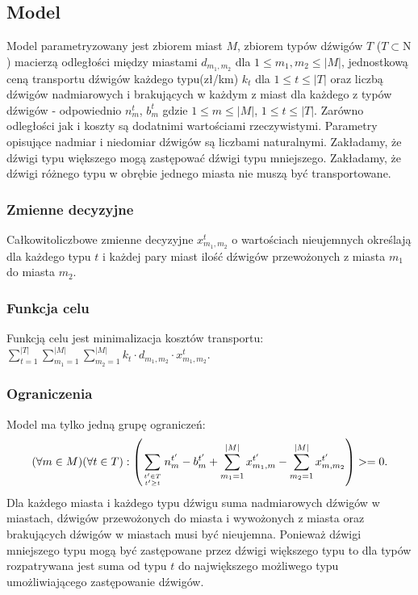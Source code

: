 \documentclass{article}
\begin{document}
\subsection{Model}
Model parametryzowany jest zbiorem miast $M$, zbiorem typów dźwigów $T$ ($T \subset \mathrm{N}$)  macierzą odległości między miastami $d_{m_1, m_2}$ dla $1 \leq m_1, m_2 \leq |M|$, jednostkową ceną transportu dźwigów każdego typu(zł/km) $k_t$ dla $1 \leq t \leq |T|$ oraz liczbą dźwigów nadmiarowych i brakujących w każdym z miast dla każdego z typów dźwigów - odpowiednio $n^t_m$, $b^t_m$ gdzie $1 \leq m \leq |M|$, $1 \leq t \leq |T|$. 
Zarówno odległości jak i koszty są dodatnimi wartościami rzeczywistymi. Parametry opisujące nadmiar i niedomiar dźwigów są liczbami naturalnymi. Zakładamy, że dźwigi typu większego mogą zastępować dźwigi typu mniejszego.
Zakładamy, że dźwigi różnego typu w obrębie jednego miasta nie muszą być transportowane.

\subsubsection{Zmienne decyzyjne}
Całkowitoliczbowe zmienne decyzyjne $x^t_{m_1,m_2}$ o wartościach nieujemnych określają dla każdego typu $t$ i każdej pary miast ilość dźwigów przewożonych z miasta $m_1$ do miasta $m_2$. 

\subsubsection{Funkcja celu}
Funkcją celu jest minimalizacja kosztów transportu: $\displaystyle \sum_{t=1}^{|T|} \sum_{m_1=1}^{|M|} \sum_{m_2=1}^{|M|} k_t \cdot d_{m_1,m_2} \cdot x^t_{m_1,m_2}$. \newline

\subsubsection{Ograniczenia}
Model ma tylko jedną grupę ograniczeń:
\[
    (\forall m \in M)(\forall t \in T): \left( \sum_{t' \in  T \atop t' \geq t} n^{t'}_m - b^{t'}_m + \sum_{m_1=1}^{|M|} x^{t'}_{m_1,m} - \sum_{m_2=1}^{|M|} x^{t'}_{m,m_2} \right) >= 0.
\]
Dla każdego miasta i każdego typu dźwigu suma nadmiarowych dźwigów w miastach, dźwigów przewożonych do miasta i wywożonych z miasta oraz brakujących dźwigów w miastach musi być nieujemna.
Ponieważ dźwigi mniejszego typu mogą być zastępowane przez dźwigi większego typu to dla typów rozpatrywana jest suma od typu $t$ do największego możliwego typu umożliwiającego zastępowanie dźwigów.
\end{document}
